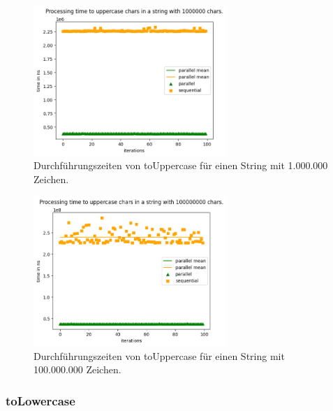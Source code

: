 \documentclass[plainarticle,zihtitle,german,final,hyperref,utf8]{zihpub}
\begin{document}
\begin{figure}[h]
\begin{center}
	\includegraphics[width=0.65\textwidth]{images/comp_upper_1000000.png}
	\caption{Durchführungszeiten von toUppercase für einen String mit 1.000.000 Zeichen.}
\end{center}
\end{figure}
\begin{figure}[h]
\begin{center}
	\includegraphics[width=0.65\textwidth]{images/comp_upper_100000000.png}
	\caption{Durchführungszeiten von toUppercase für einen String mit 100.000.000 Zeichen.}
\end{center}
\end{figure}

\clearpage
\subsubsection{toLowercase}
\end{document}
